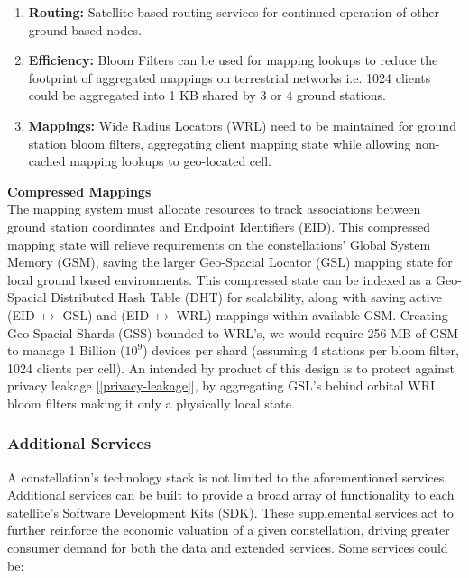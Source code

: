 \documentclass[11pt]{article}
\begin{document}
\begin{enumerate}
    \item \textbf{Routing:} Satellite-based routing services for continued operation of other ground-based nodes.
    \item \textbf{Efficiency:} Bloom Filters \cite{bloom-filters} can be used for mapping lookups to reduce the footprint of aggregated mappings on terrestrial networks i.e. 1024 clients could be aggregated into 1 KB shared by 3 or 4 ground stations.
    \item \textbf{Mappings:} Wide Radius Locators (WRL) need to be maintained for ground station bloom filters, aggregating client mapping state while allowing non-cached mapping lookups to geo-located cell.
\end{enumerate}


\pagebreak
{\noindent\textbf{Compressed Mappings}} \\

\noindent The mapping system must allocate resources to track associations between ground station coordinates and Endpoint Identifiers (EID).
This compressed mapping state will relieve requirements on the constellations' Global System Memory (GSM), saving the larger Geo-Spacial Locator (GSL) mapping state for local ground based environments.
This compressed state can be indexed as a Geo-Spacial Distributed Hash Table (DHT) for scalability, along with saving active (EID $\longmapsto$ GSL) and (EID $\longmapsto$ WRL) mappings within available GSM.
Creating Geo-Spacial Shards (GSS) bounded to WRL's, we would require 256 MB of GSM to manage 1 Billion ($10^{9}$) devices per shard (assuming 4 stations per bloom filter, 1024 clients per cell).
An intended by product of this design is to protect against privacy leakage [\ref{privacy-leakage}], by aggregating GSL's behind orbital WRL bloom filters making it only a physically local state.



\subsubsection{Additional Services}
\label{additional-services}

\noindent A constellation's technology stack is not limited to the aforementioned services. Additional services can be built to provide a broad array of functionality to each satellite's Software Development Kits (SDK).
These supplemental services act to further reinforce the economic valuation of a given constellation, driving greater consumer demand for both the data and extended services. 
Some services could be: 
\end{document}
